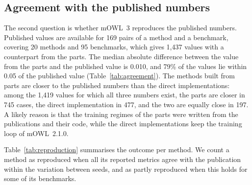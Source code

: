 \documentclass[runningheads]{llncs}
\begin{document}
\begin{table}[t]
\caption{Absolute differences between metric values in $[0,1]$: the method built from
parts against its direct implementation, and each implementation against the published
value.}\label{tab:agreement}
\centering\footnotesize\setlength{\tabcolsep}{4pt}
\end{table}

\subsection{Agreement with the published numbers}

The second question is whether mOWL~3 reproduces the published numbers. Published values
are available for 169 pairs of a method and a benchmark, covering 20 methods and 95
benchmarks, which gives 1,437 values with a counterpart from the parts. The median
absolute difference between the value from the parts and the published value is 0.010,
and 79\% of the values lie within 0.05 of the published value
(Table~\ref{tab:agreement}). The methods built from parts are closer to the published
numbers than the direct implementations: among the 1,419 values for which all three
numbers exist, the parts are closer in 745 cases, the direct implementation in 477, and
the two are equally close in 197. A likely reason is that the
training regimes of the parts were written from the publications and their code, while
the direct implementations keep the training loop of mOWL~2.1.0.

Table~\ref{tab:reproduction} summarises the outcome per method. We count a method as
reproduced when all its reported metrics agree with the publication within the variation
between seeds, and as partly reproduced when this holds for some of its benchmarks.
\end{document}
